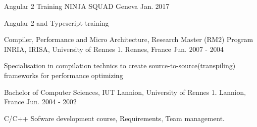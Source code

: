 

\begin{cventries}
\cventry
{Angular 2 Training} %
{NINJA SQUAD} %
{Geneva} %
{Jan. 2017} %
{
	\begin{cvitems} %
		\item {Angular 2 and Typescript training}
	\end{cvitems}
}
  \cventry
    {Compiler, Performance and Micro Architecture, Research Master (RM2) Program} %
    {INRIA, IRISA, University of Rennes 1. } %
    {Rennes, France} %
    {Jun. 2007 - 2004} %
    {
      \begin{cvitems} %
        \item {Specialisation in compilation technics to create source-to-source(transpiling) frameworks for performance optimizing  }
      \end{cvitems}
    }
\cventry
{Bachelor of Computer Sciences, } %
{IUT Lannion, University of Rennes 1. } %
{Lannion, France} %
{Jun. 2004 - 2002} %
{
	\begin{cvitems} %
			\item { C/C++ Sofware development course, Requirements, Team management. }
	\end{cvitems}
}

\end{cventries}
